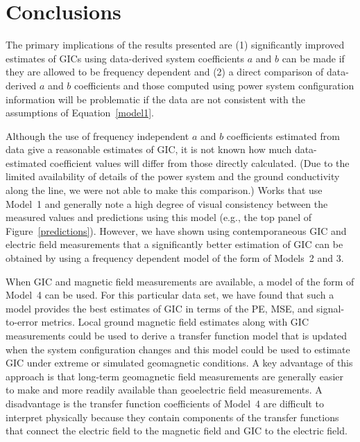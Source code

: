 \documentclass[draft,linenumbers]{agujournal2018}
\begin{document}
 
\section{Conclusions}

The primary implications of the results presented are (1) significantly improved estimates of GICs using data-derived system coefficients $a$ and $b$ can be made if they are allowed to be frequency dependent and (2) a direct comparison of data-derived $a$ and $b$ coefficients and those computed using power system configuration information will be problematic if the data are not consistent with the assumptions of Equation~\ref{model1}.

Although the use of frequency independent $a$ and $b$ coefficients estimated from data give a reasonable estimates of GIC, it is not known how much data-estimated coefficient values will differ from those directly calculated. (Due to the limited availability of details of the power system and the ground conductivity along the line, we were not able to make this comparison.) Works that use Model~1 and generally note a high degree of visual consistency between the measured values and predictions using this model (e.g., the top panel of Figure~\ref{predictions}). However, we have shown using contemporaneous GIC and electric field measurements that a significantly better estimation of GIC can be obtained by using a frequency dependent model of the form of Models~2 and 3.


When GIC and magnetic field measurements are available, a model of the form of Model~4 can be used. For this particular data set, we have found that such a model provides the best estimates of GIC in terms of the PE, MSE, and signal-to-error metrics. Local ground magnetic field estimates along with GIC measurements could be used to derive a transfer function model that is updated when the system configuration changes and this model could be used to estimate GIC under extreme or simulated geomagnetic conditions. A key advantage of this approach is that long-term geomagnetic field measurements are generally easier to make and more readily available than geoelectric field measurements. A disadvantage is the transfer function coefficients of Model~4 are difficult to interpret physically because they contain components of the transfer functions that connect the electric field to the magnetic field and GIC to the electric field.
\end{document}
